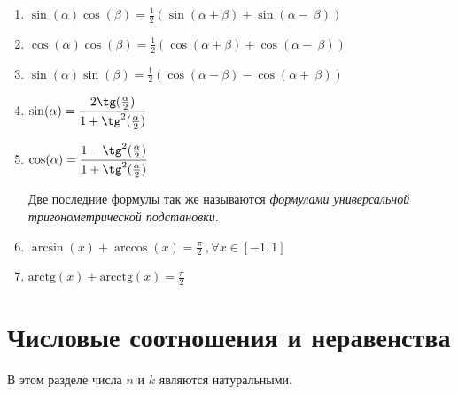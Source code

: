 \documentclass[a4paper,12pt]{scrartcl}
\begin{document}
\begin{multicols}{2}
\begin{enumerate}
\item $ \sin(\alpha)\cos(\beta) = \frac{1}{2}(\sin(\alpha + \beta) + \sin(\alpha - ~\beta))$
\item $ \cos(\alpha)\cos(\beta) = \frac{1}{2}(\cos(\alpha + \beta) + \cos(\alpha - ~\beta))$
\item $ \sin(\alpha)\sin(\beta) = \frac{1}{2}(\cos(\alpha - \beta) - \cos(\alpha + ~\beta))$

\item $ \sin(\alpha) = \cfrac{2\tg(\frac{\alpha}{2})}{1 + \tg^{2}(\frac{\alpha}{2})}$
\item $ \cos(\alpha) = \cfrac{1 - \tg^{2}(\frac{\alpha}{2})}{1 + \tg^{2}(\frac{\alpha}{2})}$

Две последние формулы так же называются \emph{формулами универсальной тригонометрической подстановки}.
 \item $\arcsin(x) + \arccos(x) = \frac{\pi}{2} \ ,\forall x \in [-1,1]$
 \item $\text{arctg}(x) + \text{arcctg}(x) = \frac{\pi}{2} $

\end{enumerate}
\end{multicols}

\section{Числовые соотношения и неравенства}

В этом разделе числа $n$ и $k$ являются натуральными.
\end{document}
